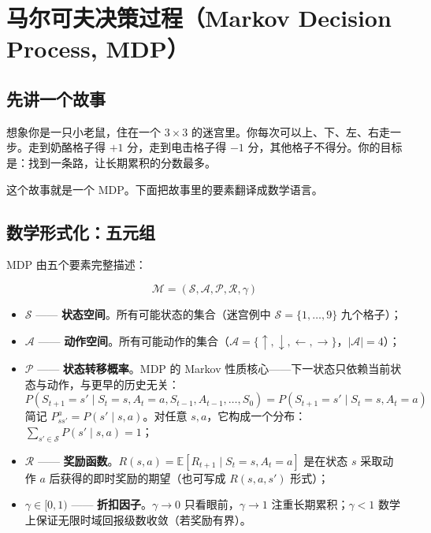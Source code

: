 \documentclass{article}
\begin{document}
\section*{马尔可夫决策过程（Markov Decision Process, MDP）}

\subsection*{先讲一个故事}

想象你是一只小老鼠，住在一个 $3\times 3$ 的迷宫里。你每次可以上、下、左、右走一步。走到奶酪格子得 $+1$ 分，走到电击格子得 $-1$ 分，其他格子不得分。你的目标是：找到一条路，让长期累积的分数最多。

这个故事就是一个 MDP。下面把故事里的要素翻译成数学语言。

\subsection*{数学形式化：五元组}

MDP 由五个要素完整描述：

\[
\boxed{\mathcal{M} = (\mathcal{S}, \mathcal{A}, \mathcal{P}, \mathcal{R}, \gamma)}
\]

\begin{itemize}
  \item $\mathcal{S}$ —— \textbf{状态空间}。所有可能状态的集合（迷宫例中 $\mathcal{S}=\{1,\ldots,9\}$ 九个格子）；
  \item $\mathcal{A}$ —— \textbf{动作空间}。所有可能动作的集合（$\mathcal{A}=\{\uparrow,\downarrow,\leftarrow,\rightarrow\}$，$|\mathcal{A}|=4$）；
  \item $\mathcal{P}$ —— \textbf{状态转移概率}。MDP 的 Markov 性质核心——下一状态只依赖当前状态与动作，与更早的历史无关：
        \[
        P(S_{t+1}=s' \mid S_t=s, A_t=a, S_{t-1}, A_{t-1},\ldots,S_0) = P(S_{t+1}=s' \mid S_t=s, A_t=a)
        \]
        简记 $P^{a}_{ss'} = P(s'\mid s,a)$。对任意 $s,a$，它构成一个分布：$\sum_{s'\in\mathcal{S}}P(s'\mid s,a)=1$；
  \item $\mathcal{R}$ —— \textbf{奖励函数}。$R(s,a)=\mathbb{E}[R_{t+1}\mid S_t=s, A_t=a]$ 是在状态 $s$ 采取动作 $a$ 后获得的即时奖励的期望（也可写成 $R(s,a,s')$ 形式）；
  \item $\gamma \in [0,1)$ —— \textbf{折扣因子}。$\gamma\to 0$ 只看眼前，$\gamma\to 1$ 注重长期累积；$\gamma<1$ 数学上保证无限时域回报级数收敛（若奖励有界）。
\end{itemize}
\end{document}

